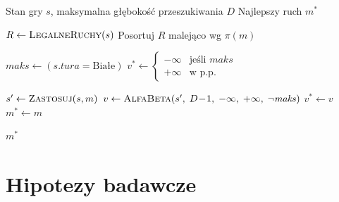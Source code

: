 \documentclass[12pt,a4paper]{article}
\begin{document}
\begin{algorithm}[H]
\caption{Wybór najlepszego ruchu --- punkt wejścia agenta heurystycznego}\label{alg:bestmove}
\begin{algorithmic}[1]

\Require Stan gry $s$, maksymalna głębokość przeszukiwania $D$
\Ensure  Najlepszy ruch $m^{*}$

\Statex
\State $R \gets \textsc{LegalneRuchy}(s)$
\State Posortuj $R$ malejąco wg $\pi(m)$

\Statex
\State $\mathit{maks} \gets (s.\mathit{tura} = \text{Białe})$
\State $v^{*} \gets \begin{cases} -\infty & \text{jeśli } \mathit{maks} \\ +\infty & \text{w~p.p.} \end{cases}$

\Statex
{}
    \State $s' \gets \textsc{Zastosuj}(s, m)$
    \State $v \gets \textsc{AlfaBeta}(s',\; D\!-\!1,\; -\infty,\; +\infty,\; \lnot\mathit{maks})$
        \State $v^{*} \gets v$
        \State $m^{*} \gets m$
    \EndIf
\EndFor

\Statex
\State \Return $m^{*}$

\end{algorithmic}
\end{algorithm}

\section{Hipotezy badawcze}
\end{document}
